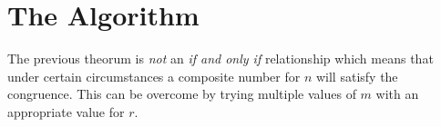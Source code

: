 \documentclass[11pt]{article}
\begin{document}
\section{The Algorithm}
The previous theorum is \emph{not} an \emph{if and only if} relationship which means that under certain circumstances a composite number for $n$ will satisfy the congruence. This can be overcome by trying multiple values of $m$ with an appropriate value for $r$.
\end{document}
